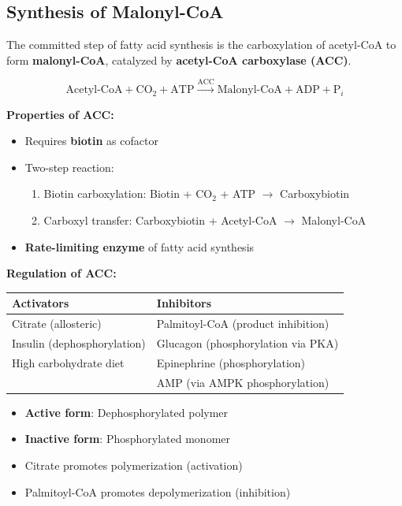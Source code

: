 \subsection{Synthesis of Malonyl-CoA}

\begin{definition}
The committed step of fatty acid synthesis is the carboxylation of acetyl-CoA to form \textbf{malonyl-CoA}, catalyzed by \textbf{acetyl-CoA carboxylase (ACC)}.
\end{definition}

\[
\text{Acetyl-CoA} + \text{CO}_2 + \text{ATP} \xrightarrow{\text{ACC}} \text{Malonyl-CoA} + \text{ADP} + \text{P}_i
\]

\textbf{Properties of ACC:}
\begin{itemize}
    \item Requires \textbf{biotin} as cofactor
    \item Two-step reaction:
    \begin{enumerate}
        \item Biotin carboxylation: Biotin + CO$_2$ + ATP $\rightarrow$ Carboxybiotin
        \item Carboxyl transfer: Carboxybiotin + Acetyl-CoA $\rightarrow$ Malonyl-CoA
    \end{enumerate}
    \item \textbf{Rate-limiting enzyme} of fatty acid synthesis
\end{itemize}

\textbf{Regulation of ACC:}

\begin{center}
\begin{tabular}{ll}
\toprule
\textbf{Activators} & \textbf{Inhibitors} \\
\midrule
Citrate (allosteric) & Palmitoyl-CoA (product inhibition) \\
Insulin (dephosphorylation) & Glucagon (phosphorylation via PKA) \\
High carbohydrate diet & Epinephrine (phosphorylation) \\
 & AMP (via AMPK phosphorylation) \\
\bottomrule
\end{tabular}
\end{center}

\begin{itemize}
    \item \textbf{Active form}: Dephosphorylated polymer
    \item \textbf{Inactive form}: Phosphorylated monomer
    \item Citrate promotes polymerization (activation)
    \item Palmitoyl-CoA promotes depolymerization (inhibition)
\end{itemize}

